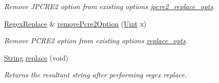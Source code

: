 \begin{DoxyCompactItemize}
\begin{DoxyCompactList}\small\item\em Remove J\+P\+C\+R\+E2 option from existing options \hyperlink{classjpcre2_1_1RegexReplace_acf13bcb16918df4b7bcaa7e49a1c7d59}{jpcre2\+\_\+replace\+\_\+opts}. \end{DoxyCompactList}\item 
\hyperlink{classjpcre2_1_1RegexReplace}{Regex\+Replace} \& \hyperlink{classjpcre2_1_1RegexReplace_adafa76534134e0c9b5342499478fd396}{remove\+Pcre2\+Option} (\hyperlink{namespacejpcre2_a078242d38221a13fb3543b9edd78c099}{Uint} x)
\begin{DoxyCompactList}\small\item\em Remove P\+C\+R\+E2 option from existing options \hyperlink{classjpcre2_1_1RegexReplace_afc79699cfcad8b7cbb26864b6b67cdc7}{replace\+\_\+opts}. \end{DoxyCompactList}\item 
\hyperlink{namespacejpcre2_a91f03070152fb228bc116c5a737f1d16}{String} \hyperlink{classjpcre2_1_1RegexReplace_afd087fa7a9bfedec802d1a3dd7edbdd0}{replace} (void)
\begin{DoxyCompactList}\small\item\em Returns the resultant string after performing regex replace. \end{DoxyCompactList}\end{DoxyCompactItemize}

